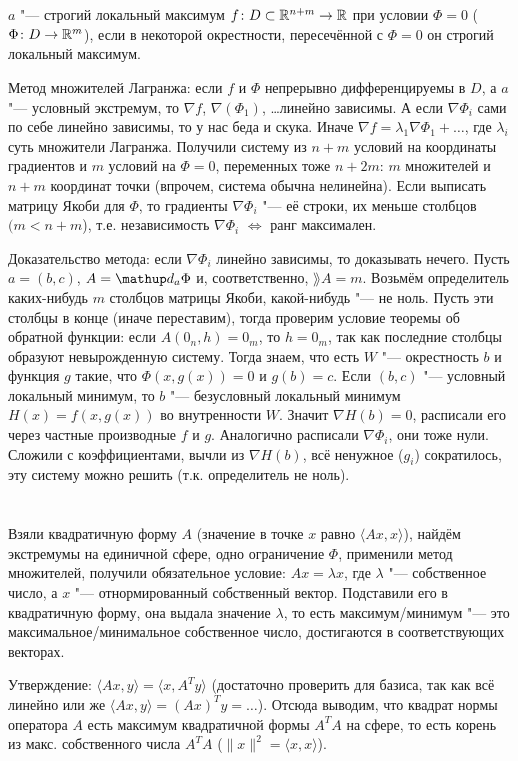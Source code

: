 \section{} %
$a$ "--- строгий локальный максимум $f \colon D \subset \mathbb{R}^{n+m} \to \mathbb{R}$ при условии $\Phi = 0$ ($\Phi \colon D \to \mathbb{R}^m$), если
в некоторой окрестности, пересечённой с $\Phi=0$ он строгий локальный максимум.

Метод множителей Лагранжа: если $f$ и $\Phi$ непрерывно дифференцируемы в $D$, а $a$ "--- условный экстремум,
то $\nabla f$, $\nabla (\Phi_1)$, \dots линейно зависимы.
А если $\nabla \Phi_i$ сами по себе линейно зависимы, то у нас беда и скука.
Иначе $\nabla f = \lambda_1 \nabla \Phi_1 + \dots$, где $\lambda_i$ суть множители Лагранжа.
Получили систему из $n+m$ условий на координаты градиентов и $m$ условий на $\Phi=0$, переменных тоже $n+2m$: $m$ множителей и $n+m$ координат точки
(впрочем, система обычна нелинейна).
Если выписать матрицу Якоби для $\Phi$, то градиенты $\nabla \Phi_i$ "--- её строки, их меньше столбцов $(m < n + m$), т.е. независимость $\nabla \Phi_i$ $\iff$ ранг максимален.

Доказательство метода: если $\nabla \Phi_i$ линейно зависимы, то доказывать нечего.
Пусть $a=(b, c)$, $A=\d_a \Phi$ и, соответственно, $\rang A = m$.
Возьмём определитель каких-нибудь $m$ столбцов матрицы Якоби, какой-нибудь "--- не ноль.
Пусть эти столбцы в конце (иначе переставим), тогда проверим условие теоремы об обратной функции: если $A(0_n, h) = 0_m$, то $h=0_m$, так как последние столбцы образуют невырожденную систему.
Тогда знаем, что есть $W$ "--- окрестность $b$ и функция $g$ такие, что $\Phi(x, g(x))=0$ и $g(b)=c$.
Если $(b, c)$ "--- условный локальный минимум, то $b$ "--- безусловный локальный минимум $H(x) = f(x, g(x))$ во внутренности $W$.
Значит $\nabla H(b) = 0$, расписали его через частные производные $f$ и $g$.
Аналогично расписали $\nabla \Phi_i$, они тоже нули.
Сложили с коэффициентами, вычли из $\nabla H(b)$, всё ненужное ($g_i$) сократилось, эту систему можно решить (т.к. определитель не ноль).

\section{} %
Взяли квадратичную форму $A$ (значение в точке $x$ равно $\langle Ax, x \rangle$), найдём экстремумы на единичной сфере, одно ограничение $\Phi$, применили метод множителей,
получили обязательное условие: $Ax = \lambda x$, где $\lambda$ "--- собственное число, а $x$ "--- отнормированный собственный вектор.
Подставили его в квадратичную форму, она выдала значение $\lambda$, то есть максимум/минимум "--- это максимальное/минимальное собственное число, достигаются в соответствующих векторах.

Утверждение: $\langle Ax, y \rangle = \langle x, A^Ty \rangle$ (достаточно проверить для базиса, так как всё линейно или же $\langle Ax, y\rangle = (Ax)^Ty = \dots$).
Отсюда выводим, что квадрат нормы оператора $A$ есть максимум квадратичной формы $A^TA$ на сфере, то есть корень из макс. собственного числа $A^TA$ ($\|x\|^2 = \langle x, x \rangle$).

